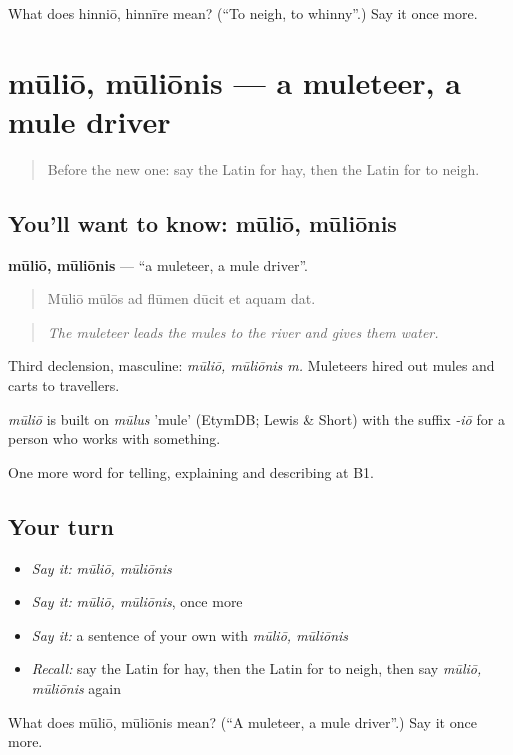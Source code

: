 \begin{tcolorbox}[breakable,colback=teal!4,colframe=teal!35!black,title={Before you move on}]
What does hinniō, hinnīre mean? (\textquotedblleft{}To neigh, to whinny\textquotedblright{}.) Say it once more.
\end{tcolorbox}
\section[mūliō, mūliōnis]{mūliō, mūliōnis — a muleteer, a mule driver}

\label{lesson:LA-C434-mulio}



\begin{quote}
Before the new one: say the Latin for hay, then the Latin for to neigh.
\end{quote}

\subsection*{You'll want to know: mūliō, mūliōnis}
\textbf{mūliō, mūliōnis} — \textquotedblleft{}a muleteer, a mule driver\textquotedblright{}.

\begin{quote}
Mūliō mūlōs ad flūmen dūcit et aquam dat.
\end{quote}

\begin{quote}
\emph{The muleteer leads the mules to the river and gives them water.}
\end{quote}

Third declension, masculine: \emph{mūliō, mūliōnis m.} Muleteers hired out mules and carts to travellers.

\begin{cousinweb}
\emph{mūliō} is built on \emph{mūlus} 'mule' (EtymDB; Lewis \& Short) with the suffix \emph{-iō} for a person who works with something.
\end{cousinweb}

\begin{grammarlens}[title={What you've built}]
One more word for telling, explaining and describing at B1.
\end{grammarlens}

\subsection*{Your turn}
\begin{itemize}
\raggedright
  \item \emph{Say it:} \emph{mūliō, mūliōnis}
  \item \emph{Say it:} \emph{mūliō, mūliōnis}, once more
  \item \emph{Say it:} a sentence of your own with \emph{mūliō, mūliōnis}
  \item \emph{Recall:} say the Latin for hay, then the Latin for to neigh, then say \emph{mūliō, mūliōnis} again
\end{itemize}

\begin{tcolorbox}[breakable,colback=teal!4,colframe=teal!35!black,title={Before you move on}]
What does mūliō, mūliōnis mean? (\textquotedblleft{}A muleteer, a mule driver\textquotedblright{}.) Say it once more.
\end{tcolorbox}
